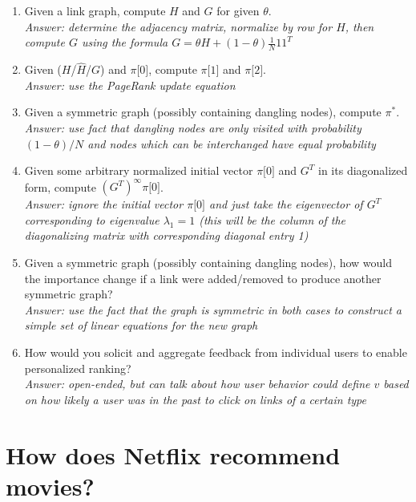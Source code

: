 \documentclass{article}
\newcommand{\MatrixVariable}[1]{\bm{\mathit{#1}}}
\begin{document}
\begin{enumerate}
\item Given a link graph, compute $\MatrixVariable{H}$ and $\MatrixVariable{G}$ for given $\theta$. \\
\textit{Answer: determine the adjacency matrix, normalize by row for $\MatrixVariable{H}$, then compute $\MatrixVariable{G}$ using the formula $\MatrixVariable{G} = \theta \MatrixVariable{H} + (1-\theta) \frac{1}{N}\MatrixVariable{1}\MatrixVariable{1}^T$}
\item Given ($\MatrixVariable{H}$/$\hat{\MatrixVariable{H}}$/$\MatrixVariable{G}$) and $\pi \lbrack 0 \rbrack$, compute $\pi \lbrack 1 \rbrack$ and $\pi \lbrack 2 \rbrack$. \\
\textit{Answer: use the PageRank update equation}
\item Given a symmetric graph (possibly containing dangling nodes), compute $\pi^*$. \\
\textit{Answer: use fact that dangling nodes are only visited with probability $(1-\theta)/N$ and nodes which can be interchanged have equal probability}
\item Given some arbitrary normalized initial vector $\pi \lbrack 0 \rbrack$ and $\MatrixVariable{G}^T$ in its diagonalized form, compute $(\MatrixVariable{G}^T)^\infty \pi \lbrack 0 \rbrack$. \\
\textit{Answer: ignore the initial vector $\pi \lbrack 0 \rbrack$ and just take the eigenvector of $\MatrixVariable{G}^T$ corresponding to eigenvalue $\lambda_1=1$ (this will be the column of the diagonalizing matrix with corresponding diagonal entry 1)}
\item Given a symmetric graph (possibly containing dangling nodes), how would the importance change if a link were added/removed to produce another symmetric graph? \\
\textit{Answer: use the fact that the graph is symmetric in both cases to construct a simple set of linear equations for the new graph}
\item How would you solicit and aggregate feedback from individual users to enable personalized ranking? \\
\textit{Answer: open-ended, but can talk about how user behavior could define $\MatrixVariable{v}$ based on how likely a user was in the past to click on links of a certain type}
\end{enumerate}

\section{How does Netflix recommend movies?}
\end{document}
